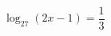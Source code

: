 \begin{ex}[type=equation]
	\begin{condition}
		$\log_{27} (2x - 1) = \dfrac{1}{3}$
	\end{condition}
\end{ex}